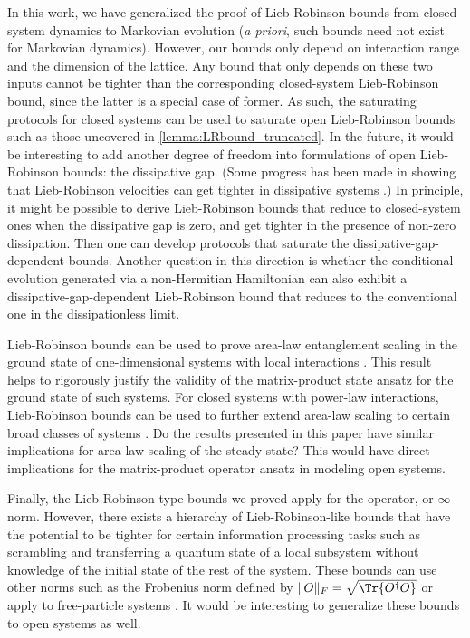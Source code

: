 In this work, we have  generalized the proof of Lieb-Robinson bounds from closed system dynamics to Markovian evolution (\textit{a priori}, such bounds need not exist for Markovian dynamics).
However, our bounds only depend on interaction range and the dimension of the lattice.
Any bound that only depends on these two inputs cannot be tighter than the corresponding closed-system Lieb-Robinson bound, since the latter is a special case of former.
As such, the saturating protocols for closed systems \cite{Tran2020hierarchylinearlightcones,Tran2021a} can be used to saturate open Lieb-Robinson bounds such as those uncovered in  \cref{lemma:LRbound_truncated}.
In the future, it would be interesting to add another degree of freedom into formulations of open Lieb-Robinson bounds: the dissipative gap. (Some progress has been made in showing that Lieb-Robinson velocities can get tighter in dissipative systems \cite{descamps2013}.)
In principle, it might be possible to derive Lieb-Robinson bounds that reduce to closed-system ones when the dissipative gap is zero, and get tighter in the presence of non-zero dissipation.
Then one can develop protocols that saturate the dissipative-gap-dependent bounds.
Another question in this direction is whether the conditional evolution generated via a non-Hermitian Hamiltonian can also exhibit a dissipative-gap-dependent Lieb-Robinson bound that reduces to the conventional one in the dissipationless limit.

Lieb-Robinson bounds can be used  to prove area-law entanglement scaling in the ground state of one-dimensional systems with local interactions \cite{Hastings2007}. This result helps to rigorously justify the validity of the matrix-product state  ansatz for the ground state of such systems.  For closed systems with power-law interactions, Lieb-Robinson bounds can be used to further extend area-law scaling to certain broad classes of systems \cite{Gong2017}. Do the results presented in this paper have similar implications for area-law scaling of the steady state? This would have direct implications for the matrix-product operator ansatz in modeling open systems.

Finally, the Lieb-Robinson-type bounds we proved apply for the operator, or $\infty$-norm.
However, there exists a hierarchy of Lieb-Robinson-like bounds that have the potential to be tighter for certain information processing tasks such as scrambling and transferring a quantum state of a local subsystem without knowledge of the initial state of the rest of the system.
These bounds can use other norms such as the Frobenius norm defined by $\|O\|_F = \sqrt{\Tr{O^\dag O}}$ \cite{Tran2020hierarchylinearlightcones,Kuwahara2020aPolynomialGrowthOutoftimeorder,Yin2020ScramblingAlltoall,Chen2021Frobenius} or apply to free-particle systems \cite{Guo2019,Tran2020hierarchylinearlightcones}.
It would be interesting to generalize these bounds to open systems as well.
